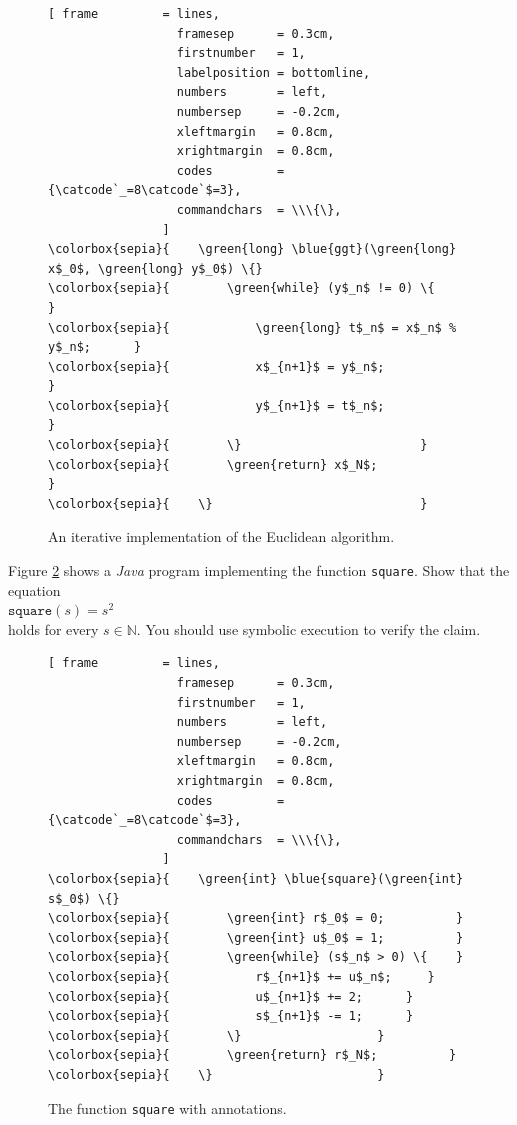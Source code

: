 \begin{figure}[!ht]
\centering
\begin{Verbatim}[ frame         = lines, 
                  framesep      = 0.3cm, 
                  firstnumber   = 1,
                  labelposition = bottomline,
                  numbers       = left,
                  numbersep     = -0.2cm,
                  xleftmargin   = 0.8cm,
                  xrightmargin  = 0.8cm,
                  codes         = {\catcode`_=8\catcode`$=3},
                  commandchars  = \\\{\},
                ]
\colorbox{sepia}{    \green{long} \blue{ggt}(\green{long} x$_0$, \green{long} y$_0$) \{}
\colorbox{sepia}{        \green{while} (y$_n$ != 0) \{           }
\colorbox{sepia}{            \green{long} t$_n$ = x$_n$ % y$_n$;      }
\colorbox{sepia}{            x$_{n+1}$ = y$_n$;              }
\colorbox{sepia}{            y$_{n+1}$ = t$_n$;              }
\colorbox{sepia}{        \}                         }
\colorbox{sepia}{        \green{return} x$_N$;                }
\colorbox{sepia}{    \}                             }
\end{Verbatim}
\vspace*{-0.3cm}
\caption{An iterative implementation of the Euclidean algorithm.}
\label{fig:gcd.stlx}
\end{figure}
\pagebreak
\exerciseEng
Figure \ref{fig:square-iterative} shows a \textsl{Java} program implementing the function \texttt{square}.  Show that the equation
\\[0.2cm]
\hspace*{1.3cm}
$\mathtt{square}(s) = s^2$
\\[0.2cm]
holds for every $s \in \mathbb{N}$.  You should use symbolic execution to verify the claim.
\eox

\begin{figure}[!ht]
\centering
\begin{Verbatim}[ frame         = lines, 
                  framesep      = 0.3cm, 
                  firstnumber   = 1,
                  numbers       = left,
                  numbersep     = -0.2cm,
                  xleftmargin   = 0.8cm,
                  xrightmargin  = 0.8cm,
                  codes         = {\catcode`_=8\catcode`$=3},
                  commandchars  = \\\{\},
                ]
\colorbox{sepia}{    \green{int} \blue{square}(\green{int} s$_0$) \{}
\colorbox{sepia}{        \green{int} r$_0$ = 0;          }
\colorbox{sepia}{        \green{int} u$_0$ = 1;          }
\colorbox{sepia}{        \green{while} (s$_n$ > 0) \{    }
\colorbox{sepia}{            r$_{n+1}$ += u$_n$;     }
\colorbox{sepia}{            u$_{n+1}$ += 2;      }
\colorbox{sepia}{            s$_{n+1}$ -= 1;      }
\colorbox{sepia}{        \}                   }
\colorbox{sepia}{        \green{return} r$_N$;          }
\colorbox{sepia}{    \}                       }
\end{Verbatim}
\vspace*{-0.3cm}
\caption{The function \texttt{square} with annotations.}
\label{fig:square-iterative}
\end{figure}


